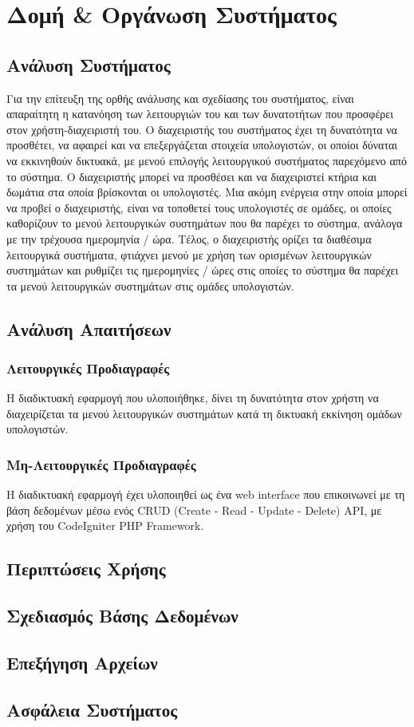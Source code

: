 \chapter{Δομή \& Οργάνωση Συστήματος}

\section{Ανάλυση Συστήματος}
Για την επίτευξη της ορθής ανάλυσης και σχεδίασης του συστήματος, είναι απαραίτητη η κατανόηση των λειτουργιών του και των δυνατοτήτων που προσφέρει στον χρήστη-διαχειριστή του. Ο διαχειριστής του συστήματος έχει τη δυνατότητα να προσθέτει, να αφαιρεί και να επεξεργάζεται στοιχεία υπολογιστών, οι οποίοι δύναται να εκκινηθούν δικτυακά, με μενού επιλογής λειτουργικού συστήματος παρεχόμενο από το σύστημα. Ο διαχειριστής μπορεί να προσθέσει και να διαχειριστεί κτήρια και δωμάτια στα οποία βρίσκονται οι υπολογιστές. Μια ακόμη ενέργεια στην οποία μπορεί να προβεί ο διαχειριστής, είναι να τοποθετεί τους υπολογιστές σε ομάδες, οι οποίες καθορίζουν το μενού λειτουργικών συστημάτων που θα παρέχει το σύστημα, ανάλογα με την τρέχουσα ημερομηνία / ώρα. Τέλος, ο διαχειριστής ορίζει τα διαθέσιμα λειτουργικά συστήματα, φτιάχνει μενού με χρήση των ορισμένων λειτουργικών συστημάτων και ρυθμίζει τις ημερομηνίες / ώρες στις οποίες το σύστημα θα παρέχει τα μενού λειτουργικών συστημάτων στις ομάδες υπολογιστών.
 
\section{Ανάλυση Απαιτήσεων}

\subsection{Λειτουργικές Προδιαγραφές}
Η διαδικτυακή εφαρμογή που υλοποιήθηκε, δίνει τη δυνατότητα στον χρήστη να διαχειρίζεται τα μενού λειτουργικών συστημάτων κατά τη δικτυακή εκκίνηση ομάδων υπολογιστών.

\subsection{Μη-Λειτουργικές Προδιαγραφές}
Η διαδικτυακή εφαρμογή έχει υλοποιηθεί ως ένα web interface που επικοινωνεί με τη βάση δεδομένων μέσω ενός CRUD (Create - Read - Update - Delete) API, με χρήση του CodeIgniter PHP Framework.

\section{Περιπτώσεις Χρήσης}

\section{Σχεδιασμός Βάσης Δεδομένων}



\section{Επεξήγηση Αρχείων}

\section{Ασφάλεια Συστήματος}
